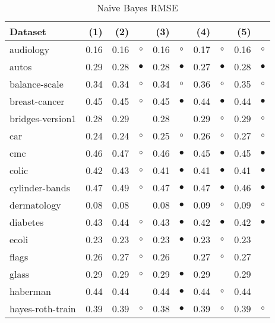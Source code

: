 \begin{table}[H]
\caption{\label{nbrmse}Naive Bayes RMSE}
\footnotesize
{\centering \begin{tabular}{lrr@{\hspace{0.1cm}}cr@{\hspace{0.1cm}}cr@{\hspace{0.1cm}}cr@{\hspace{0.1cm}}c}
\\
\hline
Dataset & (1)& (2) & & (3) & & (4) & & (5) & \\
\hline
audiology & 0.16 & 0.16 &   $\circ$ & 0.16 &   $\circ$ & 0.17 &   $\circ$ & 0.16 &    $\circ$\\
autos & 0.29 & 0.28 & $\bullet$ & 0.28 & $\bullet$ & 0.27 & $\bullet$ & 0.28 &  $\bullet$\\
balance-scale & 0.34 & 0.34 &   $\circ$ & 0.34 &   $\circ$ & 0.36 &   $\circ$ & 0.35 &    $\circ$\\
breast-cancer & 0.45 & 0.45 &   $\circ$ & 0.45 & $\bullet$ & 0.44 & $\bullet$ & 0.44 &  $\bullet$\\
bridges-version1 & 0.28 & 0.29 &           & 0.28 &           & 0.29 &   $\circ$ & 0.29 &    $\circ$\\
car & 0.24 & 0.24 &   $\circ$ & 0.25 &   $\circ$ & 0.26 &   $\circ$ & 0.27 &    $\circ$\\
cmc & 0.46 & 0.47 &   $\circ$ & 0.46 & $\bullet$ & 0.45 & $\bullet$ & 0.45 &  $\bullet$\\
colic & 0.42 & 0.43 &   $\circ$ & 0.41 & $\bullet$ & 0.41 & $\bullet$ & 0.41 &  $\bullet$\\
cylinder-bands & 0.47 & 0.49 &   $\circ$ & 0.47 & $\bullet$ & 0.47 & $\bullet$ & 0.46 &  $\bullet$\\
dermatology & 0.08 & 0.08 &           & 0.08 & $\bullet$ & 0.09 &   $\circ$ & 0.09 &    $\circ$\\
diabetes & 0.43 & 0.44 &   $\circ$ & 0.43 & $\bullet$ & 0.42 & $\bullet$ & 0.42 &  $\bullet$\\
ecoli & 0.23 & 0.23 &   $\circ$ & 0.23 & $\bullet$ & 0.23 &   $\circ$ & 0.23 &           \\
flags & 0.26 & 0.27 &   $\circ$ & 0.26 &           & 0.27 &   $\circ$ & 0.27 &           \\
glass & 0.29 & 0.29 &   $\circ$ & 0.29 & $\bullet$ & 0.29 &           & 0.29 &           \\
haberman & 0.44 & 0.44 &           & 0.44 & $\bullet$ & 0.44 &   $\circ$ & 0.44 &           \\
hayes-roth-train & 0.39 & 0.39 &   $\circ$ & 0.38 & $\bullet$ & 0.39 &   $\circ$ & 0.39 &    $\circ$\\

\end{tabular}}
\end{table}
